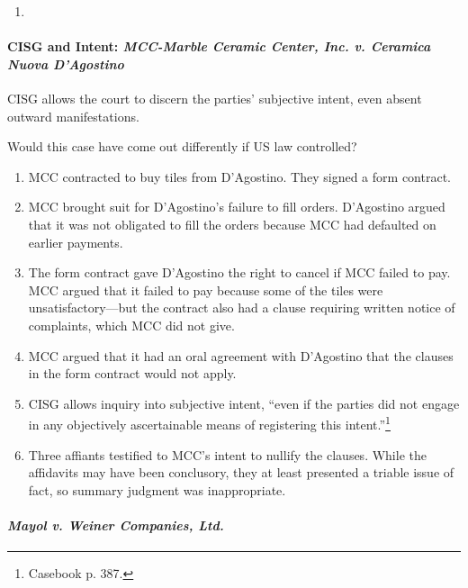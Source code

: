 \begin{enumerate}
    \item %
\end{enumerate}

\paragraph{CISG and Intent: \emph{MCC-Marble Ceramic Center, Inc. v. 
Ceramica Nuova D'Agostino}}

CISG allows the court to discern the parties' subjective intent, even absent 
outward manifestations.

Would this case have come out differently if US law controlled?

\begin{enumerate}
    \item MCC contracted to buy tiles from D'Agostino. They signed a form 
    contract.
    \item MCC brought suit for D'Agostino's failure to fill orders. D'Agostino 
    argued that it was not obligated to fill the orders because MCC had 
    defaulted on earlier payments.
    \item The form contract gave D'Agostino the right to cancel if MCC failed 
    to pay. MCC argued that it failed to pay because some of the tiles were 
    unsatisfactory---but the contract also had a clause requiring written 
    notice of complaints, which MCC did not give.
    \item MCC argued that it had an oral agreement with D'Agostino that the 
    clauses in the form contract would not apply.
    \item CISG allows inquiry into subjective intent, ``even if the parties 
    did not engage in any objectively ascertainable means of registering this 
    intent.''\footnote{Casebook p. 387.}
    \item Three affiants testified to MCC's intent to nullify the clauses. 
    While the affidavits may have been conclusory, they at least presented a 
    triable issue of fact, so summary judgment was inappropriate.
\end{enumerate}

\paragraph{\emph{Mayol v. Weiner Companies, Ltd.}}


